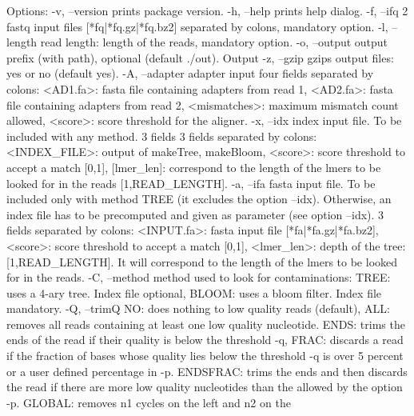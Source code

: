 \begin{DoxyCode}
Options:
 -v, --version prints package version.
 -h, --help    prints help dialog.
 -f, --ifq     2 fastq input files [*fq|*fq.gz|*fq.bz2] separated by colons, mandatory option.
 -l, --length  read length: length of the reads, mandatory option.
 -o, --output  output prefix (with path), optional (default ./out). Output
 -z, --gzip    gzips output files: yes or no (default yes).
 -A, --adapter adapter input four fields separated by colons:
               <AD1.fa>: fasta file containing adapters from read 1,
               <AD2.fa>: fasta file containing adapters from read 2,
               <mismatches>: maximum mismatch count allowed,
               <score>: score threshold  for the aligner.
 -x, --idx     index input file. To be included with any method. 3 fields
               3 fields separated by colons:
               <INDEX\_FILE>: output of makeTree, makeBloom,
               <score>: score threshold to accept a match [0,1],
               [lmer\_len]: correspond to the length of the lmers to be
                        looked for in the reads [1,READ\_LENGTH].
 -a, --ifa     fasta input file. To be included only with method TREE
               (it excludes the option --idx). Otherwise, an
               index file has to be precomputed and given as parameter
               (see option --idx). 3 fields separated by colons:
               <INPUT.fa>: fasta input file [*fa|*fa.gz|*fa.bz2],
               <score>: score threshold to accept a match [0,1],
               <lmer\_len>: depth of the tree: [1,READ\_LENGTH]. It will
                        correspond to the length of the lmers to be
                        looked for in the reads.
 -C, --method  method used to look for contaminations:
               TREE:  uses a 4-ary tree. Index file optional,
               BLOOM: uses a bloom filter. Index file mandatory.
 -Q, --trimQ   NO:       does nothing to low quality reads (default),
               ALL:      removes all reads containing at least one low
                         quality nucleotide.
               ENDS:     trims the ends of the read if their quality is
                         below the threshold -q,
               FRAC:     discards a read if the fraction of bases whose
                         quality lies below
                         the threshold -q is over 5 percent or a user
                         defined percentage in -p.
               ENDSFRAC: trims the ends and then discards the read if
                         there are more low quality nucleotides than the
                         allowed by the option -p.
               GLOBAL:   removes n1 cycles on the left and n2 on the

\end{DoxyCode}
